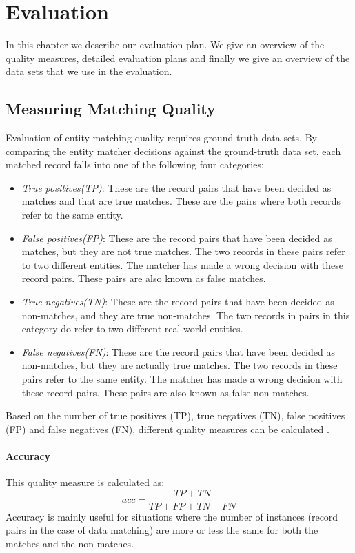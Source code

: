 \chapter{Evaluation}
In this chapter we describe our evaluation plan. We give an overview of the quality measures, detailed evaluation plans and finally we give an overview of the data sets that we use in the evaluation.

\section{Measuring Matching Quality}
Evaluation of entity matching quality requires ground-truth data sets. By comparing the entity matcher decisions against the ground-truth data set, each matched record falls into one of the following four categories\cite{Chri12}:
\begin{itemize}
\item \textit{True positives(TP)}: These are the record pairs that have been decided as matches and that are true matches. These are the pairs where both records refer to the same entity.
\item \textit{False positives(FP)}: These are the record pairs that have been decided as matches, but they are not true matches. The two records in these pairs refer to two different entities. The matcher has made a wrong decision with these record pairs. These pairs are also known as false matches.
\item \textit{True negatives(TN)}: These are the record pairs that have been decided as non-matches, and they are true non-matches. The two records in pairs in this category do refer to two different real-world entities.
\item \textit{False negatives(FN)}: These are the record pairs that have been decided as non-matches, but they are actually true matches. The two records in these pairs refer to the same entity. The matcher has made a wrong decision with these record pairs. These pairs are also known as false non-matches.
\end{itemize}
Based on the number of true positives (TP), true negatives (TN), false positives (FP) and false negatives (FN), different quality measures can be calculated \cite{Chri12}.

\subsubsection{Accuracy}
This quality measure is calculated as:
$$ acc=\frac{TP+TN}{TP+FP+TN+FN}$$
Accuracy is mainly useful for situations where the number of instances (record pairs in the case of data matching) are more or less the same for both the matches and the non-matches. 

